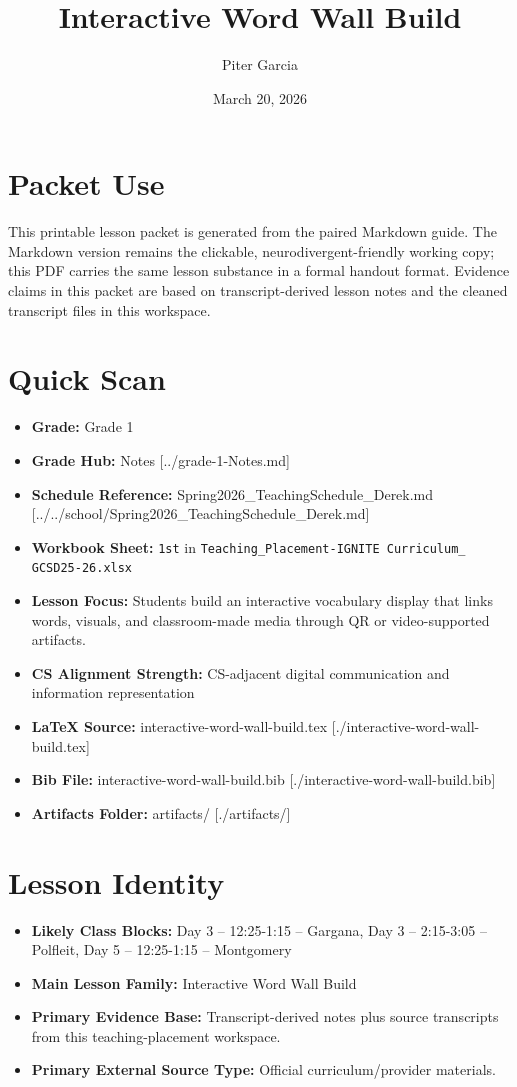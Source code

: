 \documentclass[11pt]{article}
\title{Interactive Word Wall Build}
\author{Piter Garcia}
\date{March 20, 2026}
\begin{document}
\maketitle
\section*{Packet Use}
This printable lesson packet is generated from the paired Markdown guide. The Markdown version remains the clickable, neurodivergent-friendly working copy; this PDF carries the same lesson substance in a formal handout format. Evidence claims in this packet are based on transcript-derived lesson notes and the cleaned transcript files in this workspace.

\section*{Quick Scan}
\begin{itemize}[leftmargin=*]
\item \textbf{Grade:} Grade 1
\item \textbf{Grade Hub:} Notes [../grade-1-Notes.md]
\item \textbf{Schedule Reference:} Spring2026\_TeachingSchedule\_Derek.md [../../school/Spring2026\_TeachingSchedule\_Derek.md]
\item \textbf{Workbook Sheet:} \texttt{1st} in \texttt{Teaching\_Placement-IGNITE Curriculum\_ GCSD25-26.xlsx}
\item \textbf{Lesson Focus:} Students build an interactive vocabulary display that links words, visuals, and classroom-made media through QR or video-supported artifacts.
\item \textbf{CS Alignment Strength:} CS-adjacent digital communication and information representation
\item \textbf{LaTeX Source:} interactive-word-wall-build.tex [./interactive-word-wall-build.tex]
\item \textbf{Bib File:} interactive-word-wall-build.bib [./interactive-word-wall-build.bib]
\item \textbf{Artifacts Folder:} artifacts/ [./artifacts/]
\end{itemize}

\section*{Lesson Identity}
\begin{itemize}[leftmargin=*]
\item \textbf{Likely Class Blocks:} Day 3 -- 12:25-1:15 -- Gargana, Day 3 -- 2:15-3:05 -- Polfleit, Day 5 -- 12:25-1:15 -- Montgomery
\item \textbf{Main Lesson Family:} Interactive Word Wall Build
\item \textbf{Primary Evidence Base:} Transcript-derived notes plus source transcripts from this teaching-placement workspace.
\item \textbf{Primary External Source Type:} Official curriculum/provider materials.
\end{itemize}
\end{document}
